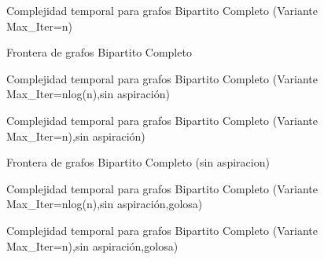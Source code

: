 \begin{figure}[H]
    \centering
    \fontsize{8}{10}\selectfont
    \resizebox{0.8\textwidth}{!}{}
    \caption{Complejidad temporal para grafos Bipartito Completo (Variante Max\_Iter=n)}
\end{figure}

\begin{figure}[H]
    \centering
    \fontsize{8}{10}\selectfont
    \resizebox{0.8\textwidth}{!}{}
    \caption{Frontera de grafos Bipartito Completo}
\end{figure}

\begin{figure}[H]
    \centering
    \fontsize{8}{10}\selectfont
    \resizebox{0.8\textwidth}{!}{}
    \caption{Complejidad temporal para grafos Bipartito Completo (Variante Max\_Iter=nlog(n),sin aspiraci\'on)}
\end{figure}

\begin{figure}[H]
    \centering
    \fontsize{8}{10}\selectfont
    \resizebox{0.8\textwidth}{!}{}
    \caption{Complejidad temporal para grafos Bipartito Completo (Variante Max\_Iter=n),sin aspiraci\'on)}
\end{figure}

\begin{figure}[H]
    \centering
    \fontsize{8}{10}\selectfont
    \resizebox{0.8\textwidth}{!}{}
    \caption{Frontera de grafos Bipartito Completo (sin aspiracion)}
\end{figure}

\begin{figure}[H]
    \centering
    \fontsize{8}{10}\selectfont
    \resizebox{0.8\textwidth}{!}{}
    \caption{Complejidad temporal para grafos Bipartito Completo (Variante Max\_Iter=nlog(n),sin aspiraci\'on,golosa)}
\end{figure}

\begin{figure}[H]
    \centering
    \fontsize{8}{10}\selectfont
    \resizebox{0.8\textwidth}{!}{}
    \caption{Complejidad temporal para grafos Bipartito Completo (Variante Max\_Iter=n),sin aspiraci\'on,golosa)}
\end{figure}


